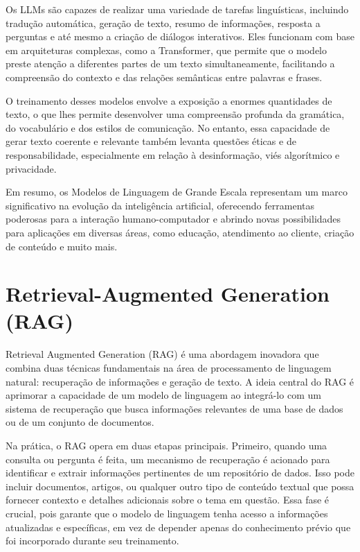 \documentclass[14pt,a4paper,oneside]{book}
\begin{document}
Os LLMs são capazes de realizar uma variedade de tarefas linguísticas, incluindo tradução automática, geração de texto, resumo de informações, resposta a perguntas e até mesmo a criação de diálogos interativos. Eles funcionam com base em arquiteturas complexas, como a Transformer, que permite que o modelo preste atenção a diferentes partes de um texto simultaneamente, facilitando a compreensão do contexto e das relações semânticas entre palavras e frases.

O treinamento desses modelos envolve a exposição a enormes quantidades de texto, o que lhes permite desenvolver uma compreensão profunda da gramática, do vocabulário e dos estilos de comunicação. No entanto, essa capacidade de gerar texto coerente e relevante também levanta questões éticas e de responsabilidade, especialmente em relação à desinformação, viés algorítmico e privacidade.

Em resumo, os Modelos de Linguagem de Grande Escala representam um marco significativo na evolução da inteligência artificial, oferecendo ferramentas poderosas para a interação humano-computador e abrindo novas possibilidades para aplicações em diversas áreas, como educação, atendimento ao cliente, criação de conteúdo e muito mais.


\chapter{Retrieval-Augmented Generation (RAG)}

Retrieval Augmented Generation (RAG) é uma abordagem inovadora que combina duas técnicas fundamentais na área de processamento de linguagem natural: recuperação de informações e geração de texto. A ideia central do RAG é aprimorar a capacidade de um modelo de linguagem ao integrá-lo com um sistema de recuperação que busca informações relevantes de uma base de dados ou de um conjunto de documentos.

Na prática, o RAG opera em duas etapas principais. Primeiro, quando uma consulta ou pergunta é feita, um mecanismo de recuperação é acionado para identificar e extrair informações pertinentes de um repositório de dados. Isso pode incluir documentos, artigos, ou qualquer outro tipo de conteúdo textual que possa fornecer contexto e detalhes adicionais sobre o tema em questão. Essa fase é crucial, pois garante que o modelo de linguagem tenha acesso a informações atualizadas e específicas, em vez de depender apenas do conhecimento prévio que foi incorporado durante seu treinamento.
\end{document}
